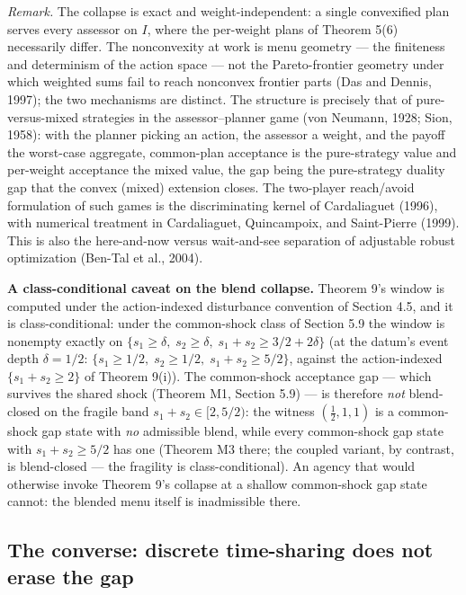 \documentclass[3p,11pt]{elsarticle}
\begin{document}
\emph{Remark.} The collapse is exact and weight-independent: a single
convexified plan serves every assessor on \(I\), where the per-weight
plans of Theorem 5(6) necessarily differ. The nonconvexity at work is
menu geometry --- the finiteness and determinism of the action space ---
not the Pareto-frontier geometry under which weighted sums fail to reach nonconvex frontier parts (Das and Dennis, 1997); the two mechanisms are distinct. The structure is precisely that of
pure-versus-mixed strategies in the assessor--planner game (von Neumann,
1928; Sion, 1958): with the planner picking an action, the assessor a
weight, and the payoff the worst-case aggregate, common-plan acceptance
is the pure-strategy value and per-weight acceptance the mixed value,
the gap being the pure-strategy duality gap that the convex (mixed)
extension closes. The two-player reach/avoid formulation of such games is the discriminating kernel of Cardaliaguet (1996), with numerical treatment in Cardaliaguet, Quincampoix, and Saint-Pierre (1999). This is also the here-and-now versus wait-and-see
separation of adjustable robust optimization (Ben-Tal et al., 2004).

\textbf{A class-conditional caveat on the blend collapse.} Theorem 9's
window is computed under the action-indexed disturbance convention of
Section 4.5, and it is class-conditional: under the common-shock class
of Section 5.9 the window is nonempty exactly on \(\{ s_1 \ge \delta,\;
s_2 \ge \delta,\; s_1 + s_2 \ge 3/2 + 2\delta \}\) (at the datum's event
depth \(\delta = 1/2\): \(\{ s_1 \ge 1/2,\; s_2 \ge 1/2,\; s_1 + s_2
\ge 5/2 \}\), against the action-indexed \(\{ s_1 + s_2 \ge 2 \}\) of
Theorem 9(i)). The common-shock acceptance gap --- which survives the
shared shock (Theorem M1, Section 5.9) --- is therefore \emph{not}
blend-closed on the fragile band \(s_1 + s_2 \in [2, 5/2)\): the witness
\((\tfrac12, 1, 1)\) is a common-shock gap state with \emph{no}
admissible blend, while every common-shock gap state with
\(s_1 + s_2 \ge 5/2\) has one (Theorem M3 there; the coupled variant,
by contrast, is blend-closed --- the fragility is class-conditional). An
agency that would otherwise invoke Theorem 9's collapse at a shallow
common-shock gap state cannot: the blended menu itself is inadmissible
there.

\subsection{The converse: discrete time-sharing does not erase
the
gap}\label{the-converse-discrete-time-sharing-does-not-erase-the-gap}
\end{document}
